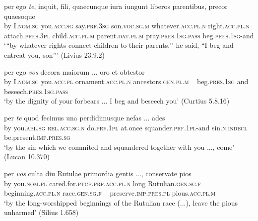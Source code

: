 \begin{exe}
\ex
\gll per ego \emph{te}, inquit, fili, quaecunque iura iungunt liberos parentibus, precor quaesoque\\
by I.\textsc{nom.sg} you.\textsc{acc.sg} say.\textsc{prf.3sg} son.\textsc{voc.sg.m} whatever.\textsc{acc.pl.n} right.\textsc{acc.pl.n} attach.\textsc{pres.3pl} child.\textsc{acc.pl.m} parent.\textsc{dat.pl.m} pray.\textsc{pres.1sg.pass} beg.\textsc{pres.1sg}-and\\
\trans `{``}by whatever rights connect children to their parents,'' he said, ``I beg and entreat you, son''' (Livius 23.9.2)
\label{separationPrepCase6}
\end{exe}

\begin{exe}
\ex
\gll per ego \emph{vos} decora maiorum ... oro et obtestor\\ 
by I.\textsc{nom.sg} you.\textsc{acc.pl} ornament.\textsc{acc.pl.n} ancestors.\textsc{gen.pl.m} ~ beg.\textsc{pres.1sg} and beseech.\textsc{pres.1sg.pass}\\
\trans `by the dignity of your forbears ... I beg and beseech you' (Curtius 5.8.16)
\label{separationPrepCase7}
\end{exe}%

\begin{exe}
\ex
\gll per \emph{te} quod fecimus una perdidimusque nefas ... ades\\
by you.\textsc{abl.sg} \textsc{rel.acc.sg.n} do.\textsc{prf.1pl} at.once squander.\textsc{prf.1pl}-and sin.\textsc{n.indecl} ~ be.present.\textsc{imp.pres.sg}\\
\trans `by the sin which we commited and squandered together with you ..., come' (Lucan 10.370)
\label{separationPrepCase8}
\end{exe}

\begin{exe}
\ex
\gll per \emph{vos} culta diu Rutulae primordia gentis ..., conservate pios\\
by you.\textsc{nom.pl} cared.for.\textsc{ptcp.prf.acc.pl.n} long Rutulian.\textsc{gen.sg.f} beginning.\textsc{acc.pl.n} race.\textsc{gen.sg.f} ~ preserve.\textsc{imp.pres.pl} pious.\textsc{acc.pl.m}\\
\trans `by the long-worshipped beginnings of the Rutulian race (...), leave the pious unharmed' (Silius 1.658)
\label{separationPrepCase9}
\end{exe}

